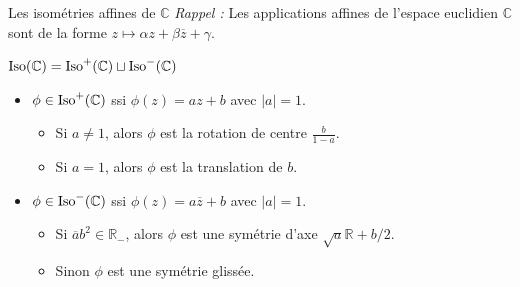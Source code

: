 \documentclass{m53beamer}
\begin{document}
\begin{frame}{Les isométries affines de $\mathbb{C}$}
  \textit{Rappel :} Les applications affines de l'espace euclidien $\mathbb{C}$ sont de la forme $z \mapsto \alpha z+\beta\overline{z}+\gamma$.\pause\medskip

  $\operatorname{Iso}(\mathbb{C}) = \operatorname{Iso}^{+}(\mathbb{C}) \sqcup \operatorname{Iso}^{-}(\mathbb{C})$
  \begin{itemize}[<+(1)->]
    \item $\phi \in \operatorname{Iso}^{+}(\mathbb{C})$ ssi $\phi(z)=az+b$ avec $|a|=1$.
      \begin{itemize}[<+(1)->]
        \item Si $a \neq 1$, alors $\phi$ est la rotation de centre $\frac{b}{1-a}$.
        \item Si $a=1$, alors $\phi$ est la translation de $b$.
      \end{itemize}
    \item $\phi \in \operatorname{Iso}^{-}(\mathbb{C})$ ssi $\phi(z)=a\overline{z}+b$ avec $|a|=1$.
      \begin{itemize}[<+(1)->]
        \item Si $\overline{a}b^{2} \in \mathbb{R}_{-}$, alors $\phi$ est une symétrie d'axe $\sqrt{a}\mathbb{R}+b/2$.
        \item Sinon $\phi$ est une symétrie glissée.
      \end{itemize}
  \end{itemize}
\end{frame}
\end{document}
